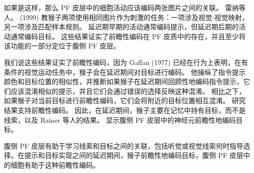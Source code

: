 如果是这样，那么 PF 皮层中的细胞活动应该编码两张图片之间的关联。 雷纳等人。 (1999) 教猴子两项使用相同图片作为刺激的任务：一项涉及视觉-视觉映射，另一项涉及匹配样本规则。 延迟期早期的活动通常编码提示，但延迟期后期的活动通常编码目标。 这些结果证实了前瞻性编码在 PF 皮质中的存在，并且至少将该功能的一部分定位于腹侧 PF 皮层。
\par
我们说这些结果证实了前瞻性编码，因为 Gaffan (1977) 已经在行为上表明，在有条件的视觉运动任务中，猴子会在延迟期间对目标进行编码。 他操纵了指令提示颜色和目标位置的相似性，并推断如果猴子在延迟期间回顾性地编码指令提示，它们应该混淆相似的提示，并且它们会通过错误的选择反映这种混淆。 相比之下，如果猴子对当前目标进行前瞻性编码，它们会将附近的目标位置相互混淆。 研究结果支持前瞻性编码。 因此，在延迟期间，猴子主要在记忆中持有目标，而不是线索，以及 Rainer 等人的结果。 显示腹侧 PF 皮层中的神经元前瞻性地编码目标。

\par
腹侧 PF 皮层有助于学习线索和目标之间的关联，包括听觉或视觉线索何时指导选择。在提示和目标实现之间的延迟期间，猴子前瞻性地编码目标，腹侧 PF 皮层中的细胞有助于这种前瞻性编码。

